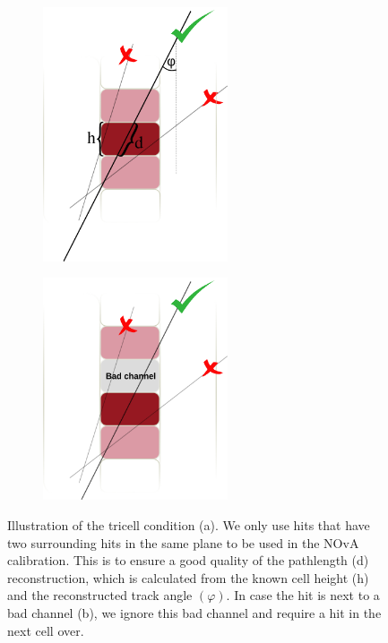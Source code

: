\documentclass[12pt,a4paper]{article}
\begin{document}
\begin{figure}[hbtp]
\centering
\begin{subfigure}[b]{0.49\textwidth}
\centering
\includegraphics[width=0.6\textwidth]{Plots/TricellConditionWithDescription.png}
\caption{}
\end{subfigure}
\begin{subfigure}[b]{0.49\textwidth}
\centering
\includegraphics[width=0.6\textwidth]{Plots/TricellConditionWithBadChannel.png}
\caption{}
\end{subfigure}
\caption{Illustration of the tricell condition (a). We only use hits that have two surrounding hits in the same plane to be used in the NOvA calibration. This is to ensure a good quality of the pathlength (d) reconstruction, which is calculated from the known cell height (h) and the reconstructed track angle $\left(\varphi\right)$. In case the hit is next to a bad channel (b), we ignore this bad channel and require a hit in the next cell over.}
\label{figTricellCondition}
\end{figure}
\end{document}
